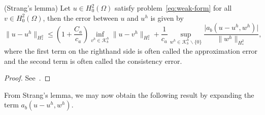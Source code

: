\begin{lemma}
  (Strang's lemma) Let $u\in H^2_0(\Omega)$ satisfy problem~\eqref{eq:weak-form} for all $v\in H^2_0(\Omega)$, then the error between $u$ and $u^h$ is given by
  \begin{equation}
    \|u-u^h\|_{H^2_*}\leq{\left(1+\frac{C_a}{c_a}\right)}\inf_{v^h\in{\mathcal{K}_b^h}}\|u-v^h\|_{H^2_*}+\frac{1}{c_a}\sup_{w^h\in \mathcal{K}_b^h\backslash \{0\}}\frac{\vert a_b(u-u^h,w^h) \vert }{\|w^h\|_{H^2_*}},
  \end{equation}
  where the first term on the righthand side is often called the approximation error and the second term is often called the consistency error.
  \begin{proof}
    See~\cite{brenner_mathematical_2007}.
  \end{proof}
\end{lemma}
From Strang's lemma, we may now obtain the following result by expanding the term $a_b(u-u^h,w^h)$.
